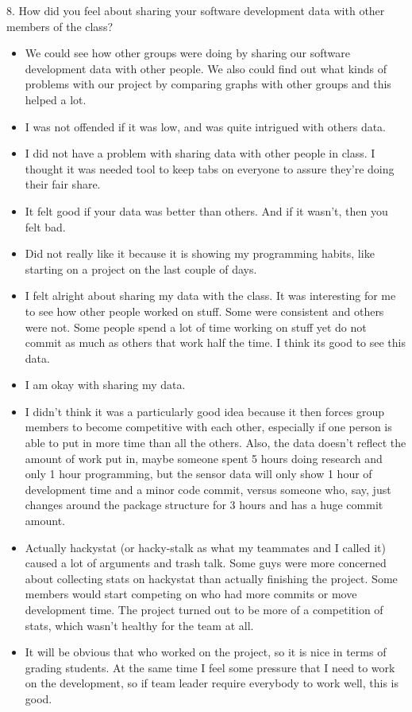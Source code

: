 8. How did you feel about sharing your software development 
data with other members of the class? 
\begin{itemize}
\item We could see how other groups were doing by sharing our software development data with other people. We also could find out what kinds of problems with our project by comparing graphs with other groups and this helped a lot. 
\item I was not offended if it was low, and was quite intrigued with others data.  
\item I did not have a problem with sharing data with other people in class.  I thought it was needed tool to keep tabs on everyone to assure they're doing their fair share.
\item It felt good if your data was better than others.  And if it wasn't, then you felt bad.
\item Did not really like it because it is showing my programming habits, like starting on a project on the last couple of days.
\item I felt alright about sharing my data with the class. It was interesting for me to see how other people worked on stuff. Some were consistent and others were not. Some people spend a lot of time working on stuff yet do not commit as much as others that work half the time. I think its good to see this data.
\item I am okay with sharing my data.  
\item I didn't think it was a particularly good idea because it then forces group members to become competitive with each other, especially if one person is able to put in more time than all the others. Also, the data doesn't reflect the amount of work put in, maybe someone spent 5 hours doing research and only 1 hour programming, but the sensor data will only show 1 hour of development time and a minor code commit, versus someone who, say, just changes around the package structure for 3 hours and has a huge commit amount.
\item Actually hackystat (or hacky-stalk as what my teammates and I called it) caused a lot of arguments and trash talk.  Some guys were more concerned about collecting stats on hackystat than actually finishing the project.  Some members would start competing on who had more commits or move development time.  The project turned out to be more of a competition of stats, which wasn't healthy for the team at all.
\item It will be obvious that who worked on the project, so it is nice in terms of grading students. At the same time I feel some pressure that I need to work on the development, so if team leader require everybody to work well, this is good.

\end{itemize}
